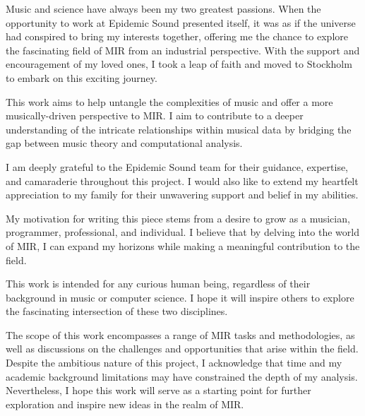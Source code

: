 \begin{preface}

Music and science have always been my two greatest passions. When the opportunity to work at Epidemic Sound presented itself, it was as if the universe had conspired to bring my interests together, offering me the chance to explore the fascinating field of MIR from an industrial perspective. With the support and encouragement of my loved ones, I took a leap of faith and moved to Stockholm to embark on this exciting journey.

This work aims to help untangle the complexities of music and offer a more musically-driven perspective to MIR. I aim to contribute to a deeper understanding of the intricate relationships within musical data by bridging the gap between music theory and computational analysis.

I am deeply grateful to the Epidemic Sound team for their guidance, expertise, and camaraderie throughout this project. I would also like to extend my heartfelt appreciation to my family for their unwavering support and belief in my abilities.

My motivation for writing this piece stems from a desire to grow as a musician, programmer, professional, and individual. I believe that by delving into the world of MIR, I can expand my horizons while making a meaningful contribution to the field.

This work is intended for any curious human being, regardless of their background in music or computer science. I hope it will inspire others to explore the fascinating intersection of these two disciplines.

The scope of this work encompasses a range of MIR tasks and methodologies, as well as discussions on the challenges and opportunities that arise within the field. Despite the ambitious nature of this project, I acknowledge that time and my academic background limitations may have constrained the depth of my analysis. Nevertheless, I hope this work will serve as a starting point for further exploration and inspire new ideas in the realm of MIR.

\newpage
\end{preface}